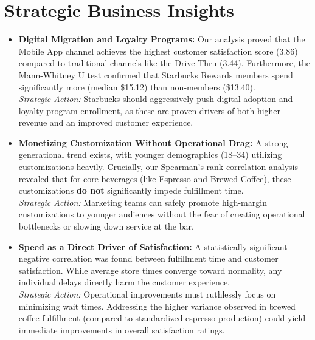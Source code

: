 \documentclass[12pt]{report}
\begin{document}
\section{Strategic Business Insights}
\begin{itemize}
    \item \textbf{Digital Migration and Loyalty Programs:} Our analysis proved that the Mobile App channel achieves the highest customer satisfaction score (3.86) compared to traditional channels like the Drive-Thru (3.44). Furthermore, the Mann-Whitney U test confirmed that Starbucks Rewards members spend significantly more (median \$15.12) than non-members (\$13.40). \\
          \textit{Strategic Action:} Starbucks should aggressively push digital adoption and loyalty program enrollment, as these are proven drivers of both higher revenue and an improved customer experience.

    \item \textbf{Monetizing Customization Without Operational Drag:} A strong generational trend exists, with younger demographics (18–34) utilizing customizations heavily. Crucially, our Spearman's rank correlation analysis revealed that for core beverages (like Espresso and Brewed Coffee), these customizations \textbf{do not} significantly impede fulfillment time. \\
          \textit{Strategic Action:} Marketing teams can safely promote high-margin customizations to younger audiences without the fear of creating operational bottlenecks or slowing down service at the bar.

          \newpage

    \item \textbf{Speed as a Direct Driver of Satisfaction:} A statistically significant negative correlation was found between fulfillment time and customer satisfaction. While average store times converge toward normality, any individual delays directly harm the customer experience. \\
          \textit{Strategic Action:} Operational improvements must ruthlessly focus on minimizing wait times. Addressing the higher variance observed in brewed coffee fulfillment (compared to standardized espresso production) could yield immediate improvements in overall satisfaction ratings.
\end{itemize}
\end{document}
